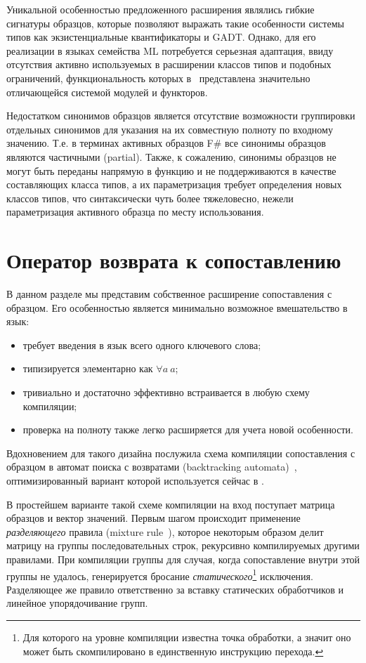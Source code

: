 Уникальной особенностью предложенного расширения являлись гибкие сигнатуры образцов, которые позволяют выражать такие особенности системы типов как экзистенциальные квантификаторы и GADT. Однако, для его реализации в языках семейства ML потребуется серьезная адаптация, ввиду отсутствия активно используемых в расширении классов типов и подобных ограничений, функциональность которых в \ocaml~представлена значительно отличающейся системой модулей и функторов.

Недостатком синонимов образцов является отсутствие возможности группировки отдельных синонимов для указания на их совместную полноту по входному значению. Т.е. в терминах активных образцов F\# все синонимы образцов являются частичными (partial). Также, к сожалению, синонимы образцов не могут быть переданы напрямую в функцию и не поддерживаются в качестве составляющих класса типов, а их параметризация требует определения новых классов типов, что синтаксически чуть более тяжеловесно, нежели параметризация активного образца по месту использования.

\section{Оператор возврата к сопоставлению} \label{sec:generalized_backtracking}

В данном разделе мы представим собственное расширение сопоставления с образцом. Его особенностью является минимально возможное вмешательство в язык:

\begin{itemize}
\item требует введения в язык всего одного ключевого слова;
\item типизируется элементарно как $\forall a\ a$;
\item тривиально и достаточно эффективно встраивается в любую схему компиляции;
\item проверка на полноту также легко расширяется для учета новой особенности.
\end{itemize}

Вдохновением для такого дизайна послужила схема компиляции сопоставления с образцом в автомат поиска с возвратами (backtracking automata)~\cite{fessant2001optimizing,augustsson1985compiling}, оптимизированный вариант которой используется сейчас в \ocaml.

В простейшем варианте такой схеме компиляции на вход поступает матрица образцов и вектор значений. Первым шагом происходит применение \textit{разделяющего} правила (mixture rule~\cite{fessant2001optimizing}), которое некоторым образом делит матрицу на группы последовательных строк, рекурсивно компилируемых другими правилами. При компиляции группы для случая, когда сопоставление внутри этой группы не удалось, генерируется бросание \textit{статического}\footnote{Для которого на уровне компиляции известна точка обработки, а значит оно может быть скомпилировано в единственную инструкцию перехода.} исключения. Разделяющее же правило ответственно за вставку статических обработчиков и линейное упорядочивание групп.

